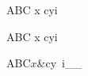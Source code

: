 \documentclass{article}
\makeatletter
\newcommand\catcodebox[1]{%
    \@catcodebox#1\@nnil
}
\def\@catcodebox{%
    \futurelet\@let@token\@@catcodebox
}
\def\@@catcodebox{%
    \ifx\@let@token\@sptoken
        \expandafter\@@catcodebox@space
    \else
        \expandafter\@@@catcodebox
    \fi
}
\def\@@catcodebox@space{%
    \afterassignment\@@catcodebox@@space
    \let\@let@token= %
}
\def\@@catcodebox@@space{%
    \@@@catcodebox{ }%
}
\def\@@@catcodebox#1{%
    \ifx\@nnil#1\relax\else
    \begingroup
    \if\noexpand#1\relax
        \edef\thecatcode{16}%
    \else
        \edef\thecatcode{\the\catcode`#1}%
    \fi
    \sbox\collectedbox{\ifnum\thecatcode=11\else\ifnum\thecatcode=12\else\normalfont\ttfamily\fi\fi\string#1}%
    \begin{tikzpicture}[>=latex,semitransparent,ultra thin,baseline=(BOX.base)]
        \def\HEIGHT{\the\ht\collectedbox}
        \def\TOTALHEIGHT{\the\totalheight}
        \def\WIDTH{\the\wd\collectedbox}
        \def\DEPTH{\the\dp\collectedbox}
        \node [inner sep=0pt,anchor=base west,opacity=1] (BOX) {\usebox\collectedbox};
        \useasboundingbox;
        \draw (0,0) -- (\WIDTH,0);
        \draw (0,-\DEPTH) rectangle (\WIDTH,\HEIGHT);
        \fill (0,0) circle (2\pgflinewidth);
        \node [inner ysep=.2pt,inner xsep=0pt,anchor=north east] at (\WIDTH,-\DEPTH)
            {\scalebox{.2}{\tiny\thecatcode}};
    \end{tikzpicture}%
    \endgroup
    \expandafter\@catcodebox
    \fi
}
\makeatother
\begin{document}
\catcodebox{ABC x cyi}

\itshape
\catcodebox{ABC x c\relax yi}

\itshape
\catcodebox{ABC$x$&cy~i_\_}
\end{document}
